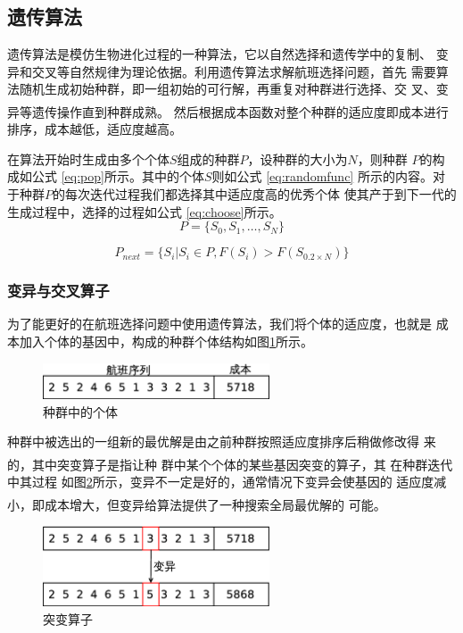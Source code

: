 \documentclass[fontset=fandol,a4paper,zihao=5]{ctexart}
\newcommand{\upcite}[1]{\textsuperscript{\textsuperscript{\cite{#1}}}}
\renewcommand{\eqref}[1]{公式 \ref{#1}}
\begin{document}
		\subsection{遗传算法}
			遗传算法是模仿生物进化过程的一种算法，它以自然选择和遗传学中的复制、
            变异和交叉等自然规律为理论依据。利用遗传算法求解航班选择问题，首先
            需要算法随机生成初始种群，即一组初始的可行解，再重复对种群进行选择、交
			叉、变异等遗传操作直到种群成熟\upcite{赵静2008数学建模与数学实验}。
            然后根据成本函数对整个种群的适应度即成本进行排序，成本越低，适应度越高。

            在算法开始时生成由多个个体$S$组成的种群$P$，设种群的大小为$N$，则种群
            $P$的构成如\eqref{eq:pop}所示。其中的个体$S$则如\eqref{eq:randomfunc}
            所示的内容。对于种群$P$的每次迭代过程我们都选择其中适应度高的优秀个体 
            使其产于到下一代的生成过程中，选择的过程如\eqref{eq:choose}所示。
            \begin{equation}
                P = \{S_0,S_1,\dots,S_N\}
                \label{eq:pop}
            \end{equation}
			
            \begin{equation}
                P_{next} = \{S_i | S_i \in P ,F(S_i)>F(S_{0.2 \times N})\}
                \label{eq:choose}
            \end{equation}

			\subsubsection{变异与交叉算子}
			\label{sec:ag_cal}
			为了能更好的在航班选择问题中使用遗传算法，我们将个体的适应度，也就是
            成本加入个体的基因中，构成的种群个体结构如图\ref{fig:life}所示。
			\begin{figure}[htbp]
				\centering
				\includegraphics[width=0.6\textwidth]{pic/life_struct.eps}
				\caption{种群中的个体}
				\label{fig:life}
			\end{figure}
		
			种群中被选出的一组新的最优解是由之前种群按照适应度排序后稍做修改得
            来的\upcite{张铃2000遗传算法机理的研究}，其中突变算子是指让种
			群中某个个体的某些基因突变的算子，其 在种群迭代中其过程
            如图\ref{fig:muate}所示，变异不一定是好的，通常情况下变异会使基因的
            适应度减小，即成本增大，但变异给算法提供了一种搜索全局最优解的
            可能\upcite{Goldberg1989Genetic}。
			\begin{figure}[!htbp]
				\centering
				\includegraphics[width=0.6\textwidth]{pic/life_muate.eps}
				\caption{突变算子}
				\label{fig:muate}
			\end{figure}
			
\end{document}
